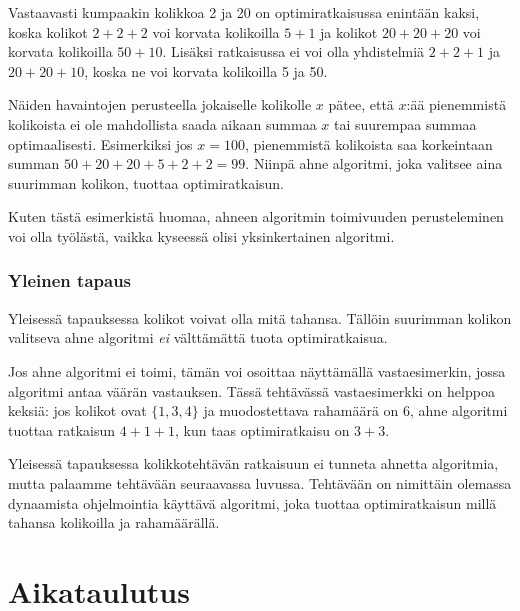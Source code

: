 Vastaavasti kumpaakin kolikkoa 2 ja 20
on optimiratkaisussa enintään kaksi,
koska kolikot $2+2+2$ voi korvata kolikoilla $5+1$
ja kolikot $20+20+20$ voi korvata kolikoilla $50+10$.
Lisäksi ratkaisussa ei voi olla yhdistelmiä
$2+2+1$ ja $20+20+10$,
koska ne voi korvata kolikoilla 5 ja 50.

Näiden havaintojen perusteella
jokaiselle kolikolle $x$ pätee,
että $x$:ää pienemmistä kolikoista
ei ole mahdollista saada aikaan summaa
$x$ tai suurempaa summaa optimaalisesti.
Esimerkiksi jos $x=100$, pienemmistä kolikoista
saa korkeintaan summan $50+20+20+5+2+2=99$.
Niinpä ahne algoritmi,
joka valitsee aina suurimman kolikon,
tuottaa optimiratkaisun.

Kuten tästä esimerkistä huomaa,
ahneen algoritmin toimivuuden perusteleminen
voi olla työlästä,
vaikka kyseessä olisi yksinkertainen algoritmi.

\subsubsection{Yleinen tapaus}

Yleisessä tapauksessa kolikot voivat olla mitä tahansa.
Tällöin suurimman kolikon valitseva ahne algoritmi
\emph{ei} välttämättä tuota optimiratkaisua.

Jos ahne algoritmi ei toimi, tämän voi osoittaa
näyttämällä vastaesimerkin, jossa algoritmi
antaa väärän vastauksen.
Tässä tehtävässä vastaesimerkki on helppoa keksiä:
jos kolikot ovat $\{1,3,4\}$ ja muodostettava
rahamäärä on 6, ahne algoritmi tuottaa ratkaisun
$4+1+1$, kun taas optimiratkaisu on $3+3$.

Yleisessä tapauksessa kolikkotehtävän ratkaisuun
ei tunneta ahnetta algoritmia,
mutta palaamme tehtävään seuraavassa luvussa.
Tehtävään on nimittäin olemassa dynaamista
ohjelmointia käyttävä algoritmi,
joka tuottaa optimiratkaisun
millä tahansa kolikoilla ja rahamäärällä.

\section{Aikataulutus}

